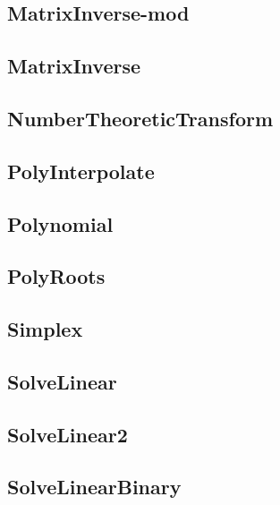 \subsection{MatrixInverse-mod}
\raggedbottom
\hrulefill
\subsection{MatrixInverse}
\raggedbottom
\hrulefill
\subsection{NumberTheoreticTransform}
\raggedbottom
\hrulefill
\subsection{PolyInterpolate}
\raggedbottom
\hrulefill
\subsection{Polynomial}
\raggedbottom
\hrulefill
\subsection{PolyRoots}
\raggedbottom
\hrulefill
\subsection{Simplex}
\raggedbottom
\hrulefill
\subsection{SolveLinear}
\raggedbottom
\hrulefill
\subsection{SolveLinear2}
\raggedbottom
\hrulefill
\subsection{SolveLinearBinary}
\raggedbottom
\hrulefill
